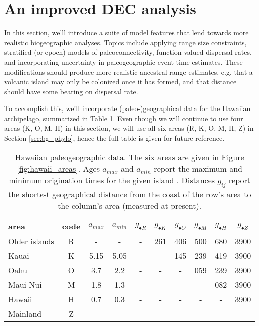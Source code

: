 

\section{An improved DEC analysis} \label{sec:bg_epoch}

In this section, we'll introduce a suite of model features that lend towards more realistic biogeographic analyses.
Topics include applying range size constraints, stratified (or epoch) models of paleoconnectivity, function-valued dispersal rates, and incorporating uncertainty in paleogeographic event time estimates.
These modifications should produce more realistic ancestral range estimates, e.g. that a volcanic island may only be colonized once it has formed, and that distance should have some bearing on dispersal rate.

To accomplish this, we'll incorporate (paleo-)geographical data for the Hawaiian archipelago, summarized in Table \ref{tab:paleogeo}.
Even though we will continue to use four areas (K, O, M, H) in this section, we will use all six areas (R, K, O, M, H, Z) in Section \ref{sec:bg_phylo}, hence the full table is given for future reference.

\begin{table}[!h]
\centering
\begin{tabular}{l|c|cc|cccccc}
area & code & $a_{max}$ & $a_{min}$ & $g_{\bullet R}$ & $g_{\bullet K}$ & $g_{\bullet O}$ & $g_{\bullet M}$ & $g_{\bullet H}$  & $g_{\bullet Z}$ \\ \hline
Older islands & R & - & - & - & 261 & 406 & 500 & 680 & 3900 \\
Kauai & K & 5.15 & 5.05 & - & - & 145 & 239 & 419 & 3900 \\
Oahu & O & 3.7  & 2.2  & - & -  & -  & 059 & 239 & 3900 \\
Maui Nui & M & 1.8  & 1.3  & - & -  & -  & -  & 082 & 3900 \\
Hawaii & H & 0.7  & 0.3  & - & -  & -  & -  & - & 3900 \\
Mainland & Z & - & - & - & - & - & - & - & - \\
\end{tabular}
\caption{Hawaiian paleogeographic data.
The six areas are given in Figure \ref{fig:hawaii_areas}.
Ages $a_{max}$ and $a_{min}$ report the maximum and minimum origination times for the given island \citep[adapted from][]{Neall2008}.
Distances $g_{ij}$ report the shortest geographical distance from the coast of the row's area to the column's area (measured at present).}
\label{tab:paleogeo}
\end{table}

